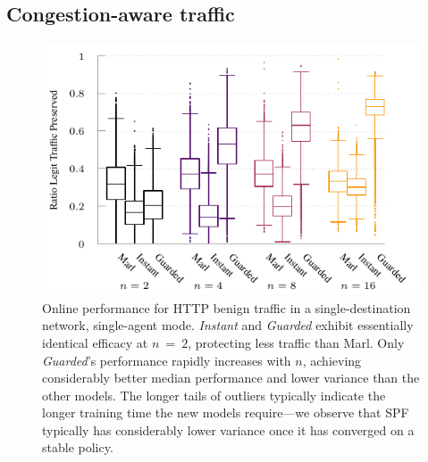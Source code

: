 \documentclass[10pt, times, comsoc]{IEEEtran}
\begin{document}
\subsection{Congestion-aware traffic}
%	
\begin{figure}
	\centering
	\includegraphics[width=0.95\linewidth]{../plots/tnsm-tcp-box-single}
	
	\caption{
		Online performance for HTTP benign traffic in a single-destination network, single-agent mode.
		\emph{Instant} and \emph{Guarded} exhibit essentially identical efficacy at $n~=~2$, protecting less traffic than Marl.
		Only \emph{Guarded}'s performance rapidly increases with $n$, achieving considerably better median performance and lower variance than the other models.
		The longer tails of outliers typically indicate the longer training time the new models require---we observe that SPF typically has considerably lower variance once it has converged on a stable policy.
		\label{fig:tcp-tree-box}
	}
\end{figure}
%	
\end{document}
